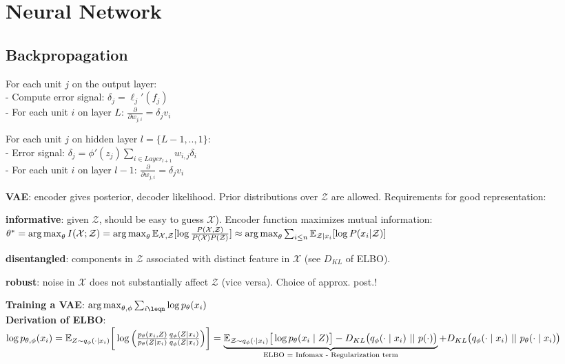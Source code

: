 \section{Neural Network}
\subsection*{Backpropagation}
For each unit $j$ on the output layer:\\
- Compute error signal: $\delta_j = \ell_j'(f_j)$\\
- For each unit $i$ on layer $L$: $\frac{\partial}{\partial w_{j,i}} = \delta_j v_i$

For each unit $j$ on hidden layer $l=\{L-1,..,1\}$:\\
- Error signal: $\delta_j = \phi'(z_j) \sum_{i\in Layer_{l+1}} w_{i,j}\delta_i$\\
- For each unit $i$ on layer $l-1$: $\frac{\partial}{\partial w_{j,i}} = \delta_j v_i$

\textbf{VAE}: encoder gives posterior, decoder likelihood. Prior distributions over $\mathcal{Z}$ are allowed. Requirements for good representation:\\
\begin{inparaitem}[\textbullet]
    \item \textbf{informative}: given $\mathcal{Z}$, should be easy to guess $\mathcal{X}$). Encoder function maximizes mutual information: $\theta^* = \operatorname*{arg\,max}_\theta I(\mathcal{X};\mathcal{Z})=\operatorname*{arg\,max}_\theta \mathbb E_{\mathcal{X},\mathcal{Z}}[\log\frac{P(\mathcal{X,\mathcal{Z}})}{P(\mathcal{X})P(\mathcal{Z})}]\\
    \approx \operatorname*{arg\,max}_\theta \sum_{i\leq n} \mathbb E_{\mathcal{Z}|x_i}[\log P(x_i|\mathcal{Z})]$\\
    \item \textbf{disentangled}: components in $\mathcal{Z}$ associated with distinct feature in $\mathcal{X}$ (see $D_{KL}$ of ELBO). \\
    \item \textbf{robust}: noise in $\mathcal{X}$ does not substantially affect $\mathcal{Z}$ (vice versa). Choice of approx. post.!\\
\end{inparaitem}

\textbf{Training a VAE}: $\argmax_{\theta,\phi}\sum_{i\leqn}\log p_{\theta}(x_i)$\\
\textbf{Derivation of ELBO}:
$
    \log p_{\theta, \phi}(x_i)
    = \mathbb E_{Z \sim q_{\phi}(\cdot \mid x_i)}
    \bigg[ \log \Big(
    \frac{p_\theta(x_i, Z)}{p_\theta (Z \mid x_i)}
    \frac{q_\phi(Z \mid x_i)}{q_\phi(Z \mid x_i)}
    \Big) \bigg]
    =
    \underbrace{\mathbb E_{\mathcal{Z} \sim q_{\phi}(\cdot \mid x_i) } \big[
        \log p_{\theta}(x_i \mid Z)
    \big]
    - D_{KL} \big(
        q_\phi(\cdot \mid x_i)\ ||\ p(\cdot)
    \big)}_\text{ELBO = Infomax - Regularization term}
    + D_{KL} \big(
        q_\phi(\cdot \mid x_i)\ ||\ p_\theta(\cdot \mid x_i)
    \big)
$


